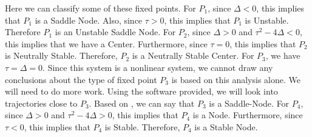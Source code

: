 Here we can classify some of these fixed points. For $P_1$, since $\Delta<0$, this implies that $P_1$ is a Saddle Node. Also, since $\tau>0$, this implies that $P_1$ is Unstable. Therefore $P_1$ is an Unstable Saddle Node. For $P_2$, since $\Delta>0$ and $\tau^2-4\Delta<0$, this implies that we have a Center. Furthermore, since $\tau=0$, this implies that $P_2$ is Neutrally Stable. Therefore, $P_2$ is a Neutrally Stable Center. For $P_3$, we have $\tau=\Delta=0$. Since this system is a nonlinear system, we cannot draw any conclusions about the type of fixed point $P_3$ is based on this analysis alone. We will need to do more work. Using the software provided, we will look into trajectories close to $P_3$. Based on , we can say that $P_3$ is a Saddle-Node. For $P_4$, since $\Delta>0$ and $\tau^2-4\Delta>0$, this implies that $P_4$ is a Node. Furthermore, since $\tau<0$, this implies that $P_4$ is Stable. Therefore, $P_4$ is a Stable Node.

